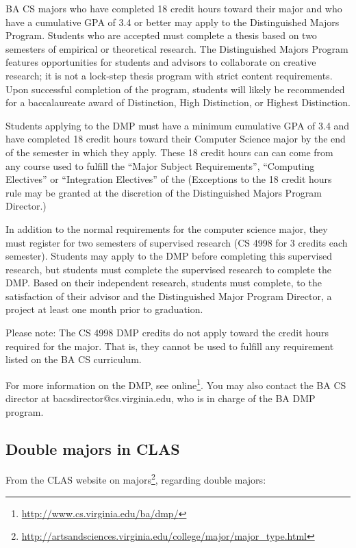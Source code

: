 \documentclass[10pt,letter]{book}
\makeatletter
\newcommand{\bacsdirectoremail}{bacsdirector@cs.virginia.edu}
\newcommand{\myurl}[1]{\footnote{\scriptsize\url{#1}}}
\makeatother
\begin{document}
BA CS majors who have completed 18 credit hours toward their major
and who have a cumulative GPA of 3.4 or better may apply to the
Distinguished Majors Program. Students who are accepted must complete
a thesis based on two semesters of empirical or theoretical
research. The Distinguished Majors Program features opportunities for
students and advisors to collaborate on creative research; it is not a
lock-step thesis program with strict content requirements. Upon
successful completion of the program, students will likely be
recommended for a baccalaureate award of Distinction, High
Distinction, or Highest Distinction.

Students applying to the DMP must have a minimum cumulative GPA of 3.4
and have completed 18 credit hours toward their Computer Science
major by the end of the semester in which they apply. These 18 credit
hours can can come from any course used to fulfill the ``Major Subject
Requirements'', ``Computing Electives'' or ``Integration Electives''
of the 
(Exceptions to the 18 credit hours rule may be granted at the
discretion of the Distinguished Majors Program Director.)

In addition to the normal requirements for the computer science major,
they must register for two semesters of supervised research (CS 4998
for 3 credits each semester). Students may apply to the DMP before
completing this supervised research, but students must complete the
supervised research to complete the DMP. Based on their independent
research, students must complete, to the satisfaction of their advisor
and the Distinguished Major Program Director, a project at least one
month prior to graduation.

Please note: The CS 4998 DMP credits do not apply toward the credit
hours required for the major. That is, they cannot be used to fulfill
any requirement listed on the BA CS curriculum.

For more information on the DMP, see
online\myurl{http://www.cs.virginia.edu/ba/dmp/}. You may also contact
the BA CS director at \bacsdirectoremail, who is in charge of the BA
DMP program.

\subsection{Double majors in CLAS}

From the CLAS website on majors\myurl{http://artsandsciences.virginia.edu/college/major/major_type.html},
regarding double majors:
\end{document}
